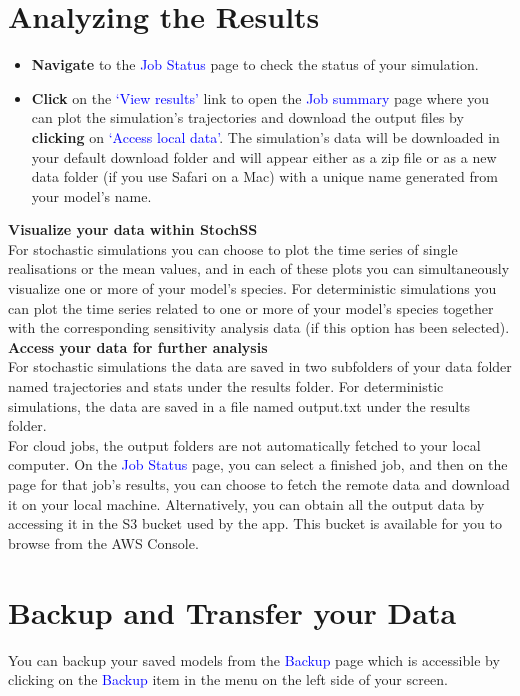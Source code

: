 \section{Analyzing the Results}
\begin{itemize}
\item \textbf{Navigate} to the \textcolor{blue}{Job Status} page to check the status of your simulation.
\item \textbf{Click} on the \textcolor{blue}{`View results'} link to open the \textcolor{blue}{Job summary} page where you can plot the simulation's trajectories and download the  output files by \textbf{clicking} on \textcolor{blue}{`Access local data'}. The simulation's data will be downloaded in your default download folder and will appear either as a zip file or as a new data folder (if you use Safari on a Mac) with a unique name generated from your model's name.
\end{itemize}
\textbf{Visualize your data within StochSS}\\
For stochastic simulations you can choose to plot the time series of single realisations or the mean values, and in each of these plots you can simultaneously visualize one or more of your model's species. For deterministic simulations you can plot the time series related to one or more of your model's species together with the corresponding sensitivity analysis data (if this option has been selected).\\
\newline
\textbf{Access your data for further analysis}\\
For stochastic simulations the data are saved in two subfolders of your data folder named trajectories and stats under the results folder. For deterministic simulations, the data are saved in
a file named output.txt under the results folder.\\
For cloud jobs, the output folders are not automatically fetched to your local computer. On the \textcolor{blue}{Job Status} page, you can select a finished job, and then on the page for that job's results, you can choose to fetch the remote data and download it on your local machine. Alternatively, you can obtain all the output data by accessing it in the S3 bucket used by the app. This bucket is available for you to browse from the AWS Console.

\section{Backup and Transfer your Data}
You can backup your saved models from the \textcolor{blue}{Backup} page which is accessible by clicking on the \textcolor{blue}{Backup} item in the menu on the left side of your screen.\\

